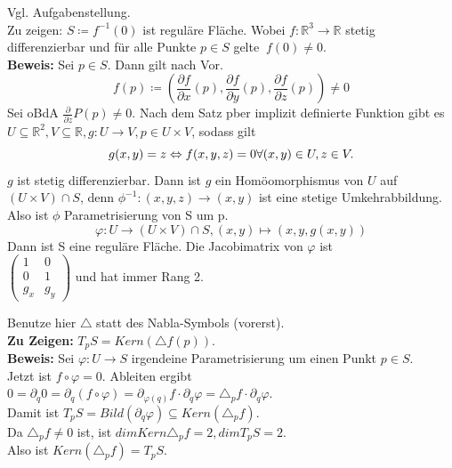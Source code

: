 \begin{problem*}[1a]
Vgl. Aufgabenstellung.\\
Zu zeigen: $S \coloneqq f^{ -1 }(0)$ ist reguläre Fläche. Wobei $f: \mathbb{R}^3 \to \mathbb{R}$ stetig differenzierbar und für alle Punkte $ p \in S $ gelte $\ f(0) \neq 0$.\\
\textbf{Beweis:} Sei $ p \in S $. Dann gilt nach Vor.
\begin{equation*}
  f(p) \coloneqq \left( \frac{\partial f}{\partial x}(p), 
                        \frac{\partial f}{\partial y}(p), 
                        \frac{\partial f}{\partial z}(p) \right) \neq 0
\end{equation*}
Sei oBdA $\frac{\partial}{\partial z} P(p) \neq 0$. Nach dem Satz pber implizit definierte Funktion gibt es\\
$U \subseteq \mathbb{R}^2, V \subseteq \mathbb{R}, g: U \to V, p \in U \times V$, sodass gilt\\
\begin{equation*}
g(x,y) = z \Leftrightarrow f(x,y,z) = 0 \hfill \forall (x,y) \in U, z \in V.\\
\end{equation*}
$ g $ ist stetig differenzierbar. Dann ist $ g $ ein Homöomorphismus von $ U $ auf $ (U \times V) \cap S$, denn $\phi^{ -1 }:(x,y,z) \to (x,y)$ ist eine stetige Umkehrabbildung.\\
Also ist $ \phi $ Parametrisierung von S um p.
\begin{equation*}
  \varphi: U \to (U \times V) \cap S, (x,y) \mapsto (x,y,g(x,y))
\end{equation*}
Dann ist S eine reguläre Fläche.
Die Jacobimatrix von $\varphi$ ist\\ 
$
\begin{pmatrix}
  1   &   0 \\
   0   &   1 \\
   g_x & g_y
\end{pmatrix}
$
und hat immer Rang 2.
\end{problem*}

\begin{problem*}[1b] Benutze hier $ \triangle $ statt des Nabla-Symbols (vorerst).\\
\textbf{Zu Zeigen:} $T_pS = Kern( \triangle f(p))$.\\
\textbf{Beweis:} Sei $ \varphi: U \to S $ irgendeine Parametrisierung um einen Punkt $ p \in S $.\\
Jetzt ist $f \circ \varphi = 0$. Ableiten ergibt\\
$ 0 = \partial_q 0 = \partial_q (f \circ \varphi) = \partial_{ \varphi(q) }f \cdot \partial_q \varphi = \triangle_p f \cdot \partial_q \varphi$.\\
Damit ist $T_pS = Bild(\partial_q \varphi) \subseteq Kern(\triangle_p f)$. \\
Da $\triangle_p f \neq 0$ ist, ist $dim Kern \triangle_p f = 2, dim T_pS = 2$. \\
Also ist $ Kern (\triangle_p f) = T_pS$.

\end{problem*}

